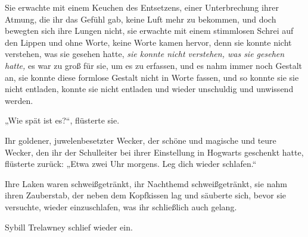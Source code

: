 Sie erwachte mit einem Keuchen des Entsetzens, einer Unterbrechung ihrer Atmung, die ihr das Gefühl gab, keine Luft mehr zu bekommen, und doch bewegten sich ihre Lungen nicht, sie erwachte mit einem stimmlosen Schrei auf den Lippen und ohne Worte, keine Worte kamen hervor, denn sie konnte nicht verstehen, was sie gesehen hatte, \emph{sie konnte nicht verstehen, was sie gesehen hatte,} es war zu groß für sie, um es zu erfassen, und es nahm immer noch Gestalt an, sie konnte diese formlose Gestalt nicht in Worte fassen, und so konnte sie sie nicht entladen, konnte sie nicht entladen und wieder unschuldig und unwissend werden.

„Wie spät ist es?“, flüsterte sie.

Ihr goldener, juwelenbesetzter Wecker, der schöne und magische und teure Wecker, den ihr der Schulleiter bei ihrer Einstellung in Hogwarts geschenkt hatte, flüsterte zurück:
„Etwa zwei Uhr morgens. Leg dich wieder schlafen.“

Ihre Laken waren schweißgetränkt, ihr Nachthemd schweißgetränkt, sie nahm ihren Zauberstab, der neben dem Kopfkissen lag und säuberte sich, bevor sie versuchte, wieder einzuschlafen, was ihr schließlich auch gelang.

Sybill Trelawney schlief wieder ein.

